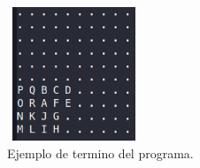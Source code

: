 \begin{center}
\begin{minipage}{0.48\linewidth}
\begin{figure}[H]
            \includegraphics[width=4cm,height=4cm]{Graphics/example_3_2_problem1.png}
            \caption{Ejemplo de termino del programa.}
            \label{fig:example_block}
        \end{figure}
    \end{minipage}
\end{center}
